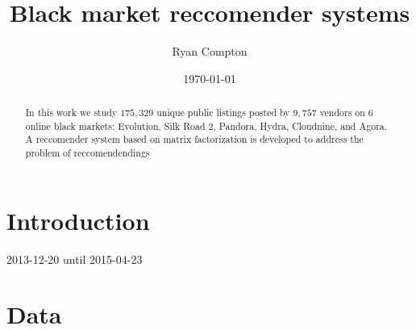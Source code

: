 \documentclass[11pt]{amsart}
\title{Black market reccomender systems}
\author{Ryan Compton}
\date{\today}
\theoremstyle{remark}
\begin{document}
\begin{abstract}

In this work we study $175,329$ unique public listings posted by $9,757$ vendors on $6$ online black markets: Evolution, Silk Road 2, Pandora, Hydra, Cloudnine, and Agora. A reccomender system based on matrix factorization is developed to address the problem of reccomendendings

\end{abstract}

\maketitle

\section{Introduction}
\label{sec:introduction}

2013-12-20 until 2015-04-23

\section{Data}
\label{sec:data}
\end{document}
